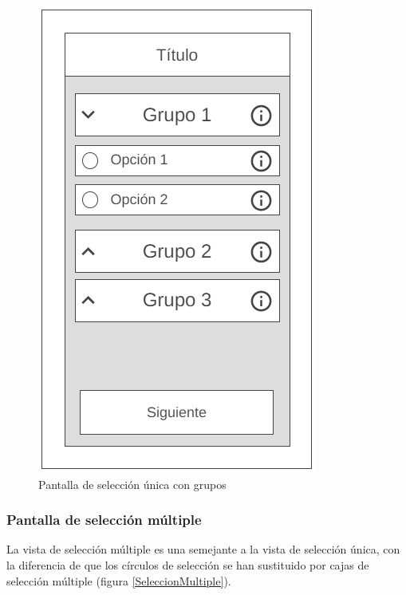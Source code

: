 \begin{figure}[H]
    \centering
    \includegraphics[scale=0.4]{Figures/Mockups/Mock_SeleccionUnicaGrupos.png}
    \caption{Pantalla de selección única con grupos}
    \label{SeleccionUnicaGrupos}    
\end{figure}
\newpage
\subsubsection{Pantalla de selección múltiple}
La vista de selección múltiple es una semejante a la vista de selección única, con la diferencia de que los círculos de selección 
se han sustituido por cajas de selección múltiple (figura \ref*{SeleccionMultiple}).

